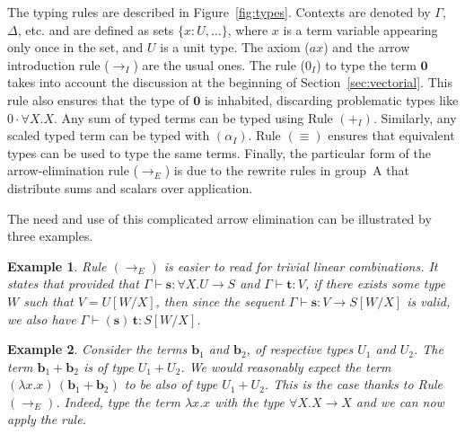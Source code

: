 \documentclass[colorlinks=true,linkcolor=black,urlcolor=black,citecolor=blue,submission,copyright,creativecommons]{eptcs}
\newtheorem{example}{Example}[section]
\newcommand{\ve}[1]{\mathrm{\textbf{#1}}}
\newcommand{\type}{\colon\!}
\begin{document}
The typing rules are described in Figure~\ref{fig:types}. 
Contexts are denoted by $\Gamma$, $\Delta$, etc. and are defined as sets $\{x\type U,\dots\}$, where $x$ is a term variable appearing only once in the set, and $U$ is a unit type.
The axiom
($ax$) and the arrow introduction rule ($\to_I$) are the usual
ones. The rule ($0_I$) to type the term $\ve 0$ takes into account
the discussion at the beginning of Section~\ref{sec:vectorial}. This rule
also ensures that the type of $\ve 0$ is inhabited, discarding
problematic types like $0\cdot \forall X.X$. Any sum of typed terms can be
typed using Rule $(+_I)$. Similarly, any scaled typed term can be typed
with $(\alpha_I)$. Rule $(\equiv)$ ensures that equivalent types can
be used to type the same terms. Finally, the particular form of the
arrow-elimination rule ($\to_E$) is due to the rewrite rules in
group~A that distribute sums and scalars over application. 

The need and use of this complicated arrow elimination can be
illustrated by three examples.

\begin{example}\rm
  Rule $(\to_E)$ is easier to read for trivial linear
  combinations. It states that provided that $\Gamma\vdash \ve s\type
  \forall X.U\to S$ and $\Gamma\vdash \ve t\type V$, if there exists
  some type $W$ such that $V=U[W/X]$, then since the sequent
  $\Gamma\vdash \ve s\type V\to S[W/X]$ is valid, we also have
  $\Gamma\vdash (\ve s)\,\ve t:S[W/X]$.
\end{example}

\begin{example}\rm
  Consider the terms $\ve b_1$ and $\ve b_2$, of respective types
  $U_1$ and $U_2$. The term $\ve b_1 + \ve b_2$ is of type
  $U_1+U_2$. We would reasonably expect the term $(\lambda x.x)\,(\ve
  b_1 + \ve b_2)$ to be also of type $U_1 + U_2$. This is the case
  thanks to Rule $(\to_E)$. Indeed, type the term $\lambda x.x$ with the
  type $\forall X.X\to X$ and we can now apply the rule.
\end{example}
\end{document}
